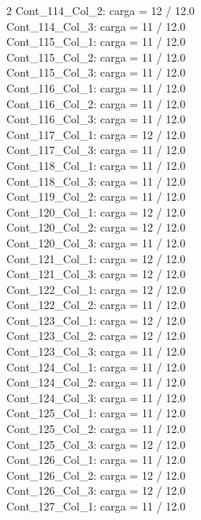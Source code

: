 \begin{multicols}{2}
Cont\_114\_Col\_2: carga = 12 / 12.0\\
Cont\_114\_Col\_3: carga = 11 / 12.0\\
Cont\_115\_Col\_1: carga = 11 / 12.0\\
Cont\_115\_Col\_2: carga = 11 / 12.0\\
Cont\_115\_Col\_3: carga = 11 / 12.0\\
Cont\_116\_Col\_1: carga = 11 / 12.0\\
Cont\_116\_Col\_2: carga = 11 / 12.0\\
Cont\_116\_Col\_3: carga = 11 / 12.0\\
Cont\_117\_Col\_1: carga = 12 / 12.0\\
Cont\_117\_Col\_3: carga = 11 / 12.0\\
Cont\_118\_Col\_1: carga = 11 / 12.0\\
Cont\_118\_Col\_3: carga = 11 / 12.0\\
Cont\_119\_Col\_2: carga = 11 / 12.0\\
Cont\_120\_Col\_1: carga = 12 / 12.0\\
Cont\_120\_Col\_2: carga = 12 / 12.0\\
Cont\_120\_Col\_3: carga = 11 / 12.0\\
Cont\_121\_Col\_1: carga = 12 / 12.0\\
Cont\_121\_Col\_3: carga = 12 / 12.0\\
Cont\_122\_Col\_1: carga = 12 / 12.0\\
Cont\_122\_Col\_2: carga = 11 / 12.0\\
Cont\_123\_Col\_1: carga = 12 / 12.0\\
Cont\_123\_Col\_2: carga = 12 / 12.0\\
Cont\_123\_Col\_3: carga = 11 / 12.0\\
Cont\_124\_Col\_1: carga = 11 / 12.0\\
Cont\_124\_Col\_2: carga = 11 / 12.0\\
Cont\_124\_Col\_3: carga = 11 / 12.0\\
Cont\_125\_Col\_1: carga = 11 / 12.0\\
Cont\_125\_Col\_2: carga = 11 / 12.0\\
Cont\_125\_Col\_3: carga = 12 / 12.0\\
Cont\_126\_Col\_1: carga = 11 / 12.0\\
Cont\_126\_Col\_2: carga = 12 / 12.0\\
Cont\_126\_Col\_3: carga = 12 / 12.0\\
Cont\_127\_Col\_1: carga = 11 / 12.0\\

\end{multicols}
